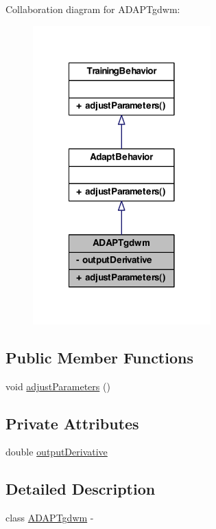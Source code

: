 Collaboration diagram for ADAPTgdwm:
\nopagebreak
\begin{figure}[H]
\begin{center}
\leavevmode
\includegraphics[width=194pt]{class_a_d_a_p_tgdwm__coll__graph}
\end{center}
\end{figure}
\subsection*{Public Member Functions}
\begin{DoxyCompactItemize}
\item 
void \hyperlink{class_a_d_a_p_tgdwm_ae7aacd1009a935359982c0b78d87a990}{adjustParameters} ()
\end{DoxyCompactItemize}
\subsection*{Private Attributes}
\begin{DoxyCompactItemize}
\item 
double \hyperlink{class_a_d_a_p_tgdwm_afd8a42a97aff880c902f241e5405abf1}{outputDerivative}
\end{DoxyCompactItemize}


\subsection{Detailed Description}
class \hyperlink{class_a_d_a_p_tgdwm}{ADAPTgdwm} -\/ 

